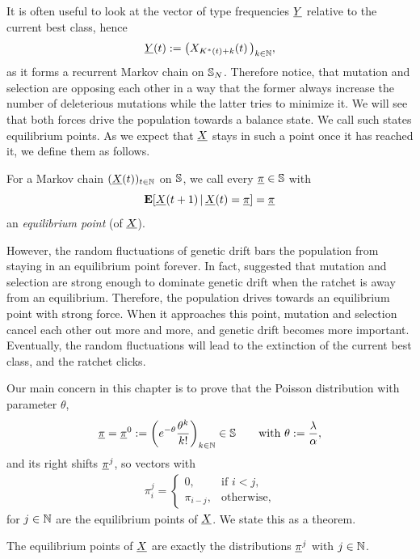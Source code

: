 It is often useful to look at the vector of type frequencies $\underline{Y}$ relative to the current best
class, hence 
\[ \underline{Y}\!\left(t\right) := \big(X_{K^*(t)+k} \! \left( t \right)\big)_{k \in \mathbb{N}}, \]
as it forms a recurrent Markov chain on $\mathbb{S}_N$. Therefore notice, that
mutation and selection are opposing each other in a way that the former always
increase the number of deleterious mutations while the latter tries to minimize
it. We will see that both forces drive the population towards a balance state.
We call such states equilibrium points. As we expect that $\underline{X}$ stays in such a
point once it has reached it, we define them as follows.
\begin{Definition}
For a Markov chain $(\underline{X}(t))_{t \in \mathbb{N}}$ on $\mathbb{S}$, we call every
$\underline{\pi} \in \mathbb{S}$ with 
\[ \mathbf{E} \! \left[  \underline{X}(t+1) \, | \, \underline{X}(t) = \underline{\pi}  \right] = \underline{\pi} \]
an \emph{equilibrium point} (of $\underline{X}$).
\end{Definition}

\noindent
However, the random fluctuations of genetic drift bars the population from
staying in an equilibrium point forever. In fact,
\citet{haigh_accumulation_1978} suggested that mutation and selection are strong
enough to dominate genetic drift when the ratchet is away from an equilibrium.
Therefore, the population drives towards an equilibrium point with strong force.
When it approaches this point, mutation and selection cancel each other out more
and more, and genetic drift becomes more important. Eventually, the random
fluctuations will lead to the extinction of the current best class, and the
ratchet clicks.

\noindent
Our main concern in this chapter is to prove that the Poisson distribution
with parameter $\theta$,
\begin{align} \label{mr:eq:pi}
\underline{\pi} = \underline{\pi}^0 := \left( e^{-\theta} \frac{\theta^k}{k!}
\right)_{k \in \mathbb{N}} \in \mathbb{S} \qquad \text{with } \theta := \frac{\lambda}{\alpha},
\end{align}
and its right shifts $\underline{\pi}^j$, so vectors with
\begin{align} \label{mr:eq:pi^j}
\pi^j_i = 
	\begin{cases}
	 0, & \text{if } i < j,\\
	 \pi_{i-j}, & \text{otherwise,} 
	\end{cases}
\end{align}
for $j \in \mathbb{N}$ are the equilibrium points of $\underline{X}$. We state this as a theorem.
% 
\begin{Theorem} \label{mr:t:statp}
The equilibrium points of $\underline{X}$ are exactly the distributions $\underline{\pi}^j$
with $j \in \mathbb{N}$.
\end{Theorem}

